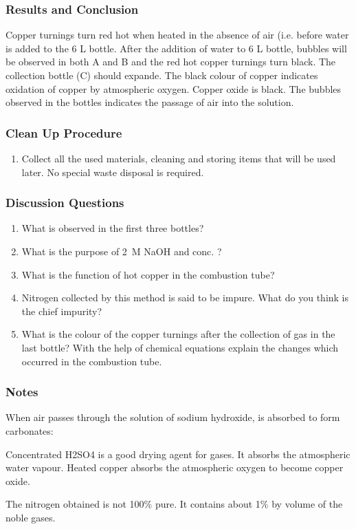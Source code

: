 \subsubsection*{Results and Conclusion}
Copper turnings turn red hot when heated in the absence of air (i.e. before water is added to the 6 L bottle. After the addition of water to 6 L bottle, bubbles will be observed in both A and B and the red hot copper turnings turn black. The collection bottle (C) should expande. The black colour of copper indicates oxidation of copper by atmospheric oxygen. Copper oxide is black. The bubbles observed in the bottles indicates the passage of air into the solution.

\subsubsection*{Clean Up Procedure}
\begin{enumerate}
\item{Collect all the used materials, cleaning and storing items that will be used later. No special waste disposal is required.}
\end{enumerate}

\subsubsection*{Discussion Questions}
\begin{enumerate}
\item{What is observed in the first three bottles?}
\item{What is the purpose of 2~M NaOH and conc. ?}
\item{What is the function of hot copper in the combustion tube?}
\item{Nitrogen collected by this method is said to be impure. What do you think is the chief impurity?}
\item{What is the colour of the copper turnings after the collection of gas in the last bottle? With the help of chemical equations explain the changes which occurred in the combustion tube.}
\end{enumerate}

\subsubsection*{Notes}
When air passes through the solution of sodium hydroxide,  is absorbed to form carbonates:
\begin{center}
\end{center}
Concentrated H2SO4 is a good drying agent for gases. It absorbs the atmospheric water vapour.
Heated copper absorbs the atmospheric oxygen to become copper oxide.
\begin{center}
\end{center}
The nitrogen obtained is not 100\% pure. It contains about 1\% by volume of the noble gases.

